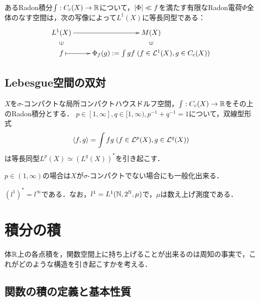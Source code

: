 \documentclass[uplatex,dvipdfmx]{jsreport}
\begin{document}
\begin{proposition}[絶対連続測度の表現]\label{prop-Riesz-4}
    あるRadon積分$\int:C_c(X)\to\mathbb{R}$について，$\lvert\Phi\rvert\ll f$を満たす有限なRadon電荷$\Phi$全体のなす空間は，次の写像によって$L^1(X)$に等長同型である：
    \[\xymatrix@R-2pc{
        L^1(X)\ar[r]&M(X)\\
        \rotatebox[origin=c]{90}{$\in$}&\rotatebox[origin=c]{90}{$\in$}\\
        f\ar@{|->}[r]&\Phi_f(g):=\int gf\;(f\in\L^1(X),g\in C_c(X))
    }\]
\end{proposition}

\subsection{Lebesgue空間の双対}

\begin{theorem}[双対]\label{thm-duality-of-Lp}
    $X$を$\sigma$-コンパクトな局所コンパクトハウスドルフ空間，$\int:C_c(X)\to\mathbb{R}$をその上のRadon積分とする．
    $p\in[1,\infty],q\in[1,\infty),p^{-1}+q^{-1}=1$について，双線型形式
    \[\langle f,g\rangle=\int fg\;(f\in\mathcal{L}^p(X),g\in\mathcal{L}^q(X))\]
    は等長同型$L^p(X)\simeq (L^q(X))^*$を引き起こす．
\end{theorem}
\begin{remark}
    $p\in(1,\infty)$の場合は$X$が$\sigma$-コンパクトでない場合にも一般化出来る．
\end{remark}

\begin{example}
    $(l^1)^*=l^\infty$である．なお，$l^1=L^1(\mathbb{N},2^{\mathbb{N}},\mu)$で，$\mu$は数え上げ測度である．
\end{example}

\section{積分の積}

\begin{tcolorbox}[colframe=ForestGreen, colback=ForestGreen!10!white,breakable,colbacktitle=ForestGreen!40!white,coltitle=black,fonttitle=\bfseries\sffamily,
title=]
    体$\mathbb{R}$上の各点積を，関数空間上に持ち上げることが出来るのは周知の事実で，これがどのような構造を引き起こすかを考える．
\end{tcolorbox}

\subsection{関数の積の定義と基本性質}
\end{document}
